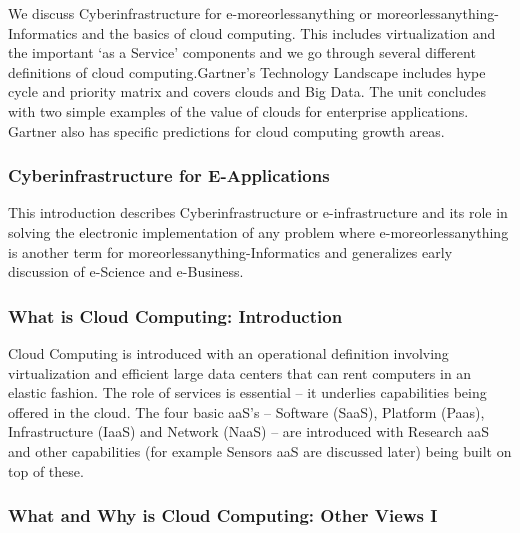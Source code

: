We discuss Cyberinfrastructure for e-moreorlessanything or
moreorlessanything-Informatics and the basics of cloud computing. This
includes virtualization and the important `as a Service' components and
we go through several different definitions of cloud computing.Gartner's
Technology Landscape includes hype cycle and priority matrix and covers
clouds and Big Data. The unit concludes with two simple examples of the
value of clouds for enterprise applications. Gartner also has specific
predictions for cloud computing growth areas.


\subsubsection{Cyberinfrastructure for E-Applications}

This introduction describes Cyberinfrastructure or e-infrastructure and
its role in solving the electronic implementation of any problem where
e-moreorlessanything is another term for moreorlessanything-Informatics
and generalizes early discussion of e-Science and e-Business.


\subsubsection{What is Cloud Computing: Introduction}

Cloud Computing is introduced with an operational definition involving
virtualization and efficient large data centers that can rent computers
in an elastic fashion. The role of services is essential -- it underlies
capabilities being offered in the cloud. The four basic aaS's --
Software (SaaS), Platform (Paas), Infrastructure (IaaS) and Network
(NaaS) -- are introduced with Research aaS and other capabilities (for
example Sensors aaS are discussed later) being built on top of these.


\subsubsection{What and Why is Cloud Computing: Other Views I}

